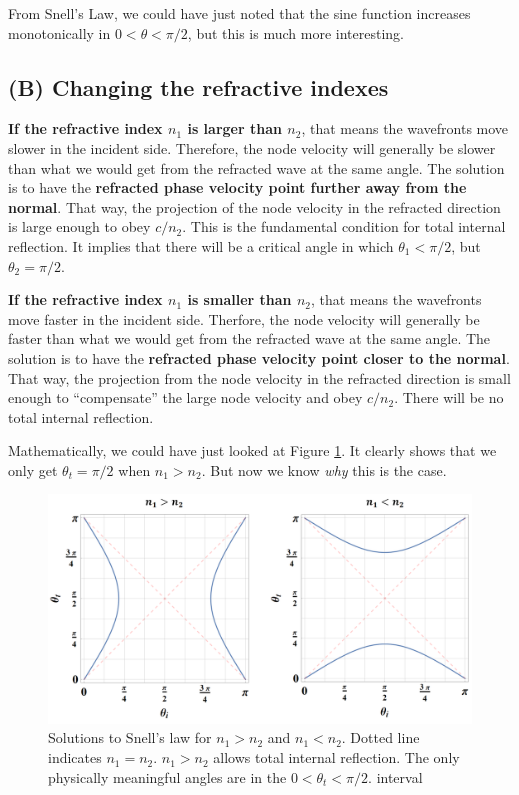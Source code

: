 From Snell's Law, we could have just noted that the sine function increases monotonically in $0<\theta<\pi/2$, but this is much more interesting.

\subsection*{(B) Changing the refractive indexes}

\textbf{If the refractive index $n_1$ is larger than $n_2$}, that means the wavefronts move slower in the incident side. Therefore, the node velocity will generally be slower than what we would get from the refracted wave at the same angle. The solution is to have the \textbf{refracted phase velocity point further away from the normal}. That way, the projection of the node velocity in the refracted direction is large enough to obey $c/n_2$. This is the fundamental condition for total internal reflection. It implies that there will be a critical angle in which $\theta_1<\pi/2$, but $\theta_2=\pi/2$.

\textbf{If the refractive index $n_1$ is smaller than $n_2$}, that means the wavefronts move faster in the incident side. Therfore, the node velocity will generally be faster than what we would get from the refracted wave at the same angle. The solution is to have the \textbf{refracted phase velocity point closer to the normal}. That way, the projection from the node velocity in the refracted direction is small enough to ``compensate'' the large node velocity and obey $c/n_2$. There will be no total internal reflection.

Mathematically, we could have just looked at Figure \ref{fig:snell.law}. It clearly shows that we only get $\theta_t=\pi/2$ when $n_1>n_2$. But now we know \textit{why} this is the case.

\begin{figure}[H]
    \centering
    \includegraphics[width=1\linewidth]{Figuras/snell solutions.png}
    \caption{Solutions to Snell's law for $n_1>n_2$ and $n_1<n_2$. Dotted line indicates $n_1=n_2$. $n_1>n_2$ allows total internal reflection. The only physically meaningful angles are in the $0<\theta_t<\pi/2$. interval}
    \label{fig:snell.law}
\end{figure}


